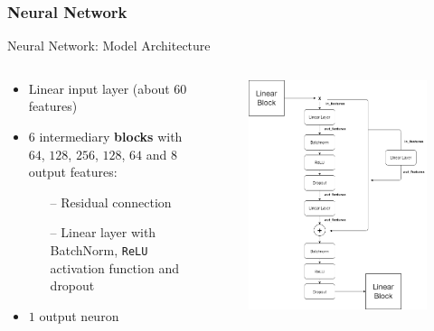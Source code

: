 \documentclass[ngerman,inputenc]{beamer}
\begin{document}
\subsubsection{Neural Network}

\begin{frame}{Neural Network: Model Architecture}

  \begin{columns}
    \begin{column}{0.5\textwidth}
      \begin{itemize}
        \item Linear input layer (about $60$ features)
        \item $6$ intermediary \textbf{blocks} with $64$, $128$, $256$, $128$, $64$ and $8$ output features:
              \begin{itemize}
                \item[–] Residual connection
                \item[–] Linear layer with BatchNorm, \texttt{ReLU} activation function and dropout
              \end{itemize}
        \item $1$ output neuron
      \end{itemize}
    \end{column}
    \begin{column}{0.5\textwidth}
      \begin{center}
        \begin{figure}
          \includegraphics[width=0.95\columnwidth]{mlp_architecture.png}
        \end{figure}
      \end{center}
    \end{column}
  \end{columns}


\end{frame}
\end{document}
